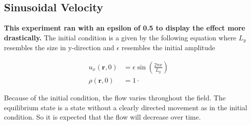 \subsection{Sinusoidal Velocity}\label{subsec:sinusoidal-velocity}
\textbf{This experiment ran with an epsilon of 0.5 to display the effect more drastically.}
The initial condition is a given by the following equation where $L_y$ resembles the size in y-direction and $\epsilon$ resembles the initial amplitude

\begin{equation*}
    \begin{aligned}
        u_x(\mathbf{r},0) &= \epsilon \sin \left( \frac{2 \pi x}{L_y} \right) \\
        \rho(\mathbf{r},0) &= 1 \cdot
    \end{aligned}
\end{equation*}

Because of the initial condition, the flow varies throughout the field.
The equilibrium state is a state without a clearly directed movement as in the initial condition.
So it is expected that the flow will decrease over time.


